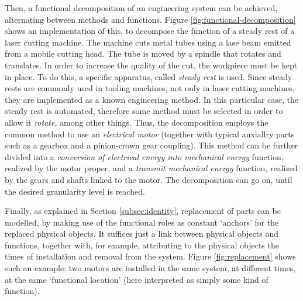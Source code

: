 \documentclass[
]{ceurart}
\begin{document}
Then, a functional decomposition of an engineering system can be achieved, alternating between methods and functions. Figure \ref{fig:functional-decomposition} shows an implementation of this, to decompose the function of a steady rest of a laser cutting machine.
The machine cuts metal tubes using a lase beam emitted from a mobile cutting head. The tube is moved by a spindle that rotates and translates. In order to increase the quality of the cut, the workpiece must be kept in place. To do this, a specific apparatus, called \textit{steady rest} is used. Since steady rests are commonly used in tooling machines, not only in laser cutting machines, they are implemented as a known engineering method. In this particular case, the steady rest is automated, therefore some method must be selected in order to allow it \textit{rotate}, among other things. Thus, the decomposition employs the common method to use an \textit{electrical motor} (together with typical auxiallry parts such as a gearbox and a pinion-crown gear coupling). This method can be further divided into a \textit{conversion of electrical energy into mechanical energy} function, realized by the motor proper, and a \textit{transmit mechanical energy} function, realized by the gears and shafts linked to the motor. The decomposition can go on, until the desired granularity level is reached.

Finally, as explained in Section \ref{subsec:identity}, replacement of parts can be modelled, by making use of the functional roles as constant `anchors' for the replaced physical objects. It suffices just a link between physical objects and functions, together with, for example, attributing to the physical objects the times of installation and removal from the system. Figure \ref{fig:replacement} shows such an example: two motors are installed in the same system, at different times, at the same `functional location' (here interpreted as simply some kind of function).
\end{document}
